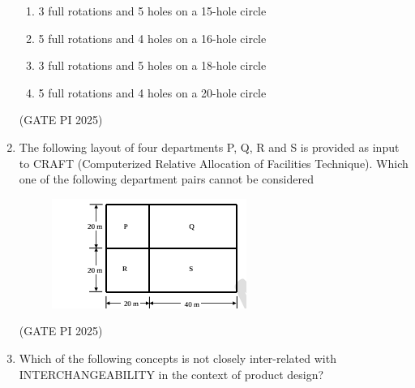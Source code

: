 \documentclass[journal,12pt,onecolumn]{IEEEtran}
\theoremstyle{remark}
\begin{document}
\begin{enumerate}
\begin{enumerate}
    \item 3 full rotations and 5 holes on a 15-hole circle
    \item 5 full rotations and 4 holes on a 16-hole circle
    \item 3 full rotations and 5 holes on a 18-hole circle
    \item 5 full rotations and 4 holes on a 20-hole circle
\end{enumerate}

\hfill (GATE PI 2025)

\item The following layout of four departments P, Q, R and S is provided as input to CRAFT (Computerized Relative Allocation of Facilities Technique). Which one of the following department pairs cannot be considered

\begin{figure}[H]
\centering
\includegraphics[width=0.5\columnwidth]{fig6.png}
\caption{}
\end{figure}


\begin{enumerate}
\end{enumerate}

\hfill (GATE PI 2025)

\item Which of the following concepts is not closely inter-related with INTERCHANGEABILITY in the context of product design?

\begin{enumerate}
\end{enumerate}


\end{enumerate}
\end{document}
